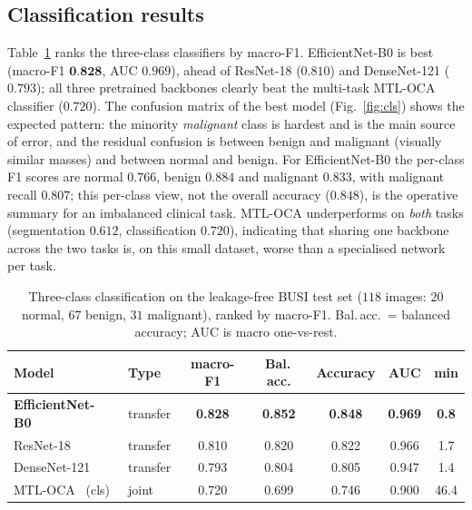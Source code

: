 \documentclass[11pt]{article}
\newcommand{\best}[1]{\textbf{#1}}
\begin{document}
\subsection{Classification results}
\label{sec:results-cls}
Table~\ref{tab:cls} ranks the three-class classifiers by macro-F1. EfficientNet-B0
is best (macro-F1 $\best{0.828}$, AUC $0.969$), ahead of ResNet-18 ($0.810$) and
DenseNet-121 ($0.793$); all three pretrained backbones clearly beat the multi-task
MTL-OCA classifier ($0.720$). The confusion matrix of the best model
(Fig.~\ref{fig:cls}) shows the expected pattern: the minority \emph{malignant}
class is hardest and is the main source of error, and the residual confusion is
between benign and malignant (visually similar masses) and between normal and
benign. For EfficientNet-B0 the per-class F1 scores are normal $0.766$, benign
$0.884$ and malignant $0.833$, with malignant recall $0.807$; this per-class view,
not the overall accuracy ($0.848$), is the operative summary for an imbalanced
clinical task. MTL-OCA underperforms on \emph{both} tasks (segmentation $0.612$,
classification $0.720$), indicating that sharing one backbone across the two tasks
is, on this small dataset, worse than a specialised network per task.

\begin{table}[t]
\centering
\caption{Three-class classification on the leakage-free BUSI test set ($118$
images: $20$ normal, $67$ benign, $31$ malignant), ranked by macro-F1. Bal.\,acc.\
= balanced accuracy; AUC is macro one-vs-rest.}
\label{tab:cls}
\small
\begin{tabular}{@{}llccccc@{}}
\toprule
Model & Type & macro-F1 & Bal.\,acc. & Accuracy & AUC & min \\
\midrule
\best{EfficientNet-B0}~\cite{tan2019efficientnet} & transfer & \best{0.828} & \best{0.852} & \best{0.848} & \best{0.969} & \best{0.8} \\
ResNet-18~\cite{he2016resnet}      & transfer & 0.810 & 0.820 & 0.822 & 0.966 & 1.7 \\
DenseNet-121~\cite{huang2017densenet}& transfer & 0.793 & 0.804 & 0.805 & 0.947 & 1.4 \\
MTL-OCA~\cite{lu2025multitask} (cls)& joint    & 0.720 & 0.699 & 0.746 & 0.900 & 46.4 \\
\bottomrule
\end{tabular}
\end{table}
\end{document}
